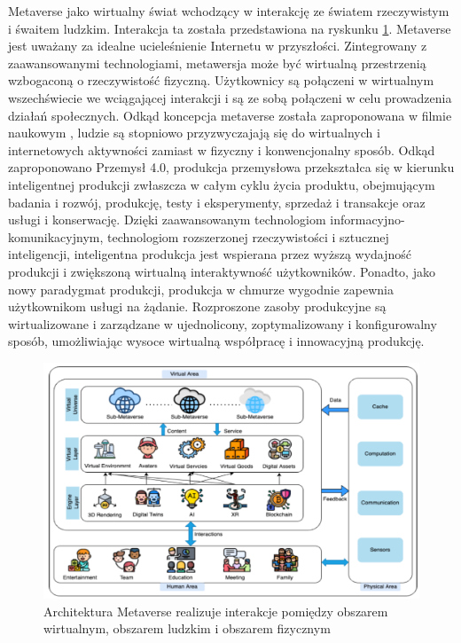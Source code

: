 Metaverse jako wirtualny świat  wchodzący w interakcję ze światem rzeczywistym i śwaitem ludzkim. Interakcja ta została przedstawiona na ryskunku \ref{abstractMetaverseArchitectureHumanVirtualPhisical}. Metaverse jest uważany za idealne ucieleśnienie Internetu w przyszłości. Zintegrowany z zaawansowanymi technologiami, metawersja może być wirtualną przestrzenią wzbogaconą o rzeczywistość fizyczną. Użytkownicy są połączeni w wirtualnym wszechświecie we wciągającej interakcji i są ze sobą połączeni w celu prowadzenia działań społecznych. Odkąd koncepcja metaverse została zaproponowana w filmie naukowym , ludzie są stopniowo przyzwyczajają się do wirtualnych i internetowych aktywności zamiast w fizyczny i konwencjonalny sposób. Odkąd zaproponowano Przemysł 4.0, produkcja przemysłowa przekształca się w kierunku inteligentnej produkcji zwłaszcza w całym cyklu życia produktu, obejmującym badania i rozwój, produkcję, testy i eksperymenty, sprzedaż i transakcje oraz usługi i konserwację. Dzięki zaawansowanym technologiom informacyjno-komunikacyjnym, technologiom rozszerzonej rzeczywistości i sztucznej inteligencji, inteligentna produkcja jest wspierana przez wyższą wydajność produkcji i zwiększoną wirtualną interaktywność użytkowników. Ponadto, jako nowy paradygmat produkcji, produkcja w chmurze wygodnie zapewnia użytkownikom usługi na żądanie. Rozproszone zasoby produkcyjne są wirtualizowane i zarządzane w ujednolicony, zoptymalizowany i konfigurowalny sposób, umożliwiając wysoce wirtualną współpracę i innowacyjną produkcję\cite{industrialMetaverseForSmartManufacturing}. 

\begin{figure}[htbp!]
    \centering
    \includegraphics[width=\textwidth]{images/metaverse/metaverseAbstractArchitecture.png}
    \caption{Architektura Metaverse realizuje interakcje pomiędzy obszarem wirtualnym, obszarem ludzkim i obszarem fizycznym\cite{aSurveyofMobileEdgeComputingForMetaverse}}
    \label{abstractMetaverseArchitectureHumanVirtualPhisical}
\end{figure}

